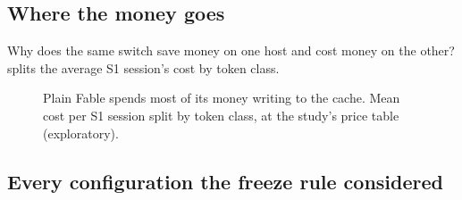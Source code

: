\subsection{Where the money goes}

Why does the same switch save money on one host and cost money on the other?  splits the average S1 session's cost by token class.

\begin{figure}[htbp]
\centering
{}\par\smallskip

\caption{Plain Fable spends most of its money writing to the cache. Mean cost per S1 session split by token class, at the study's price table (exploratory).}
\label{fig:composition}
\end{figure}


\subsection{Every configuration the freeze rule considered}


\begingroup\small

\endgroup

